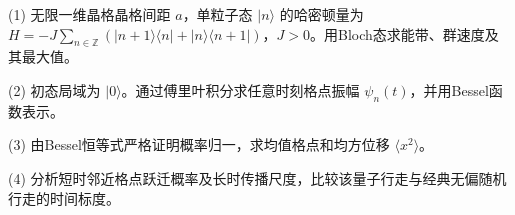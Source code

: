 (1) 无限一维晶格晶格间距 \(a\)，单粒子态 \(|n\rangle\) 的哈密顿量为 \(H=-J\sum_{n\in\mathbb Z}(|n+1\rangle\langle n|+|n\rangle\langle n+1|)\)，\(J>0\)。用Bloch态求能带、群速度及其最大值。

(2) 初态局域为 \(|0\rangle\)。通过傅里叶积分求任意时刻格点振幅 \(\psi_n(t)\)，并用Bessel函数表示。

(3) 由Bessel恒等式严格证明概率归一，求均值格点和均方位移 \(\langle x^2\rangle\)。

(4) 分析短时邻近格点跃迁概率及长时传播尺度，比较该量子行走与经典无偏随机行走的时间标度。
